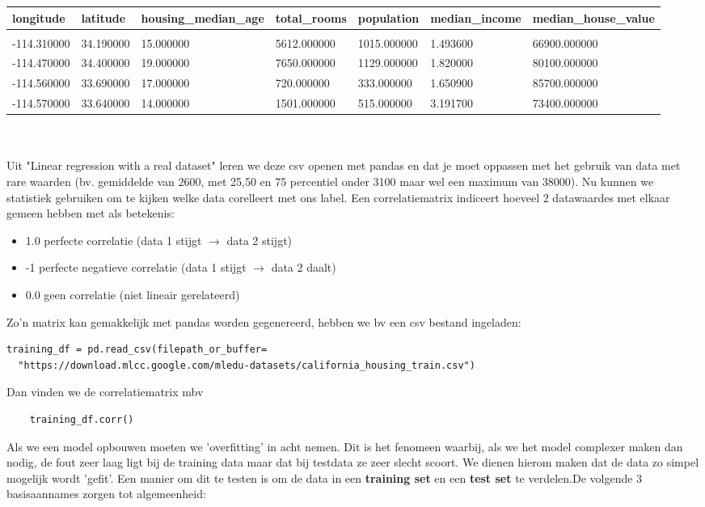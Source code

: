 \documentclass[10pt,a4paper,twoside]{article}
\begin{document}
\begin{table}[]
\begin{tabular}{lllllll}
longitude   & latitude  & housing\_median\_age & total\_rooms & population  & median\_income & median\_house\_value \\
\hline
\\
-114.310000 & 34.190000 & 15.000000            & 5612.000000  & 1015.000000 & 1.493600       & 66900.000000         \\
-114.470000 & 34.400000 & 19.000000            & 7650.000000  & 1129.000000 & 1.820000       & 80100.000000         \\
-114.560000 & 33.690000 & 17.000000            & 720.000000   & 333.000000  & 1.650900       & 85700.000000         \\
-114.570000 & 33.640000 & 14.000000            & 1501.000000  & 515.000000  & 3.191700       & 73400.000000        
\end{tabular}
\end{table}
\\\\
Uit "Linear regression with a real dataset" leren we deze csv openen met pandas en dat je moet oppassen met het gebruik van data  met rare waarden (bv. gemiddelde van 2600, met 25,50 en 75 percentiel onder 3100 maar wel een maximum van 38000). Nu kunnen we statistiek gebruiken om te kijken welke data corelleert met ons label. Een correlatiematrix indiceert hoeveel 2 datawaardes met elkaar gemeen hebben met als betekenis:
\begin{itemize}
	\item 1.0 perfecte correlatie (data 1 stijgt $\rightarrow$ data 2 stijgt)
	\item -1 perfecte negatieve correlatie (data 1 stijgt $\rightarrow$ data 2 daalt)
	\item 0.0 geen correlatie (niet lineair gerelateerd)
\end{itemize}
Zo'n matrix kan gemakkelijk met pandas worden gegenereerd, hebben we bv een csv bestand ingeladen:
\begin{verbatim}
training_df = pd.read_csv(filepath_or_buffer=
  "https://download.mlcc.google.com/mledu-datasets/california_housing_train.csv")	
\end{verbatim}
Dan vinden we de correlatiematrix mbv
\begin{verbatim}
	training_df.corr()
\end{verbatim}
Als we een model opbouwen moeten we 'overfitting' in acht nemen. Dit is het fenomeen waarbij, als we het model complexer maken dan nodig, de fout zeer laag ligt bij de training data maar dat bij testdata ze zeer slecht scoort. We dienen hierom maken dat de data zo simpel mogelijk wordt 'gefit'. Een manier om dit te testen is om de data in een {\bf training set} en een {\bf test set} te verdelen.De volgende 3 basisaannames zorgen tot algemeenheid:
\end{document}
